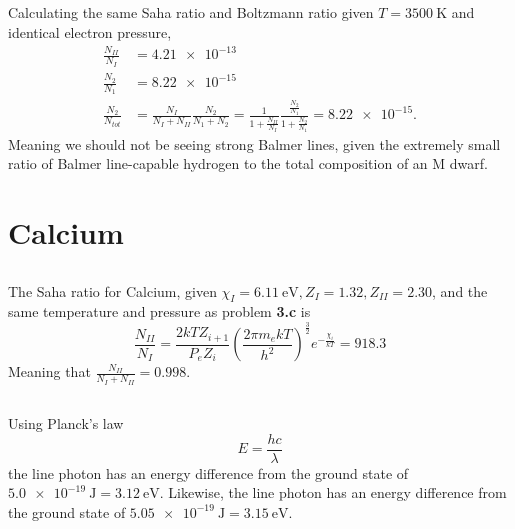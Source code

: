 \documentclass{article}
\begin{document}
\subsection{}

Calculating the same Saha ratio and Boltzmann ratio given \(T = \SI{3500}{\kelvin}\) and identical electron pressure,
\begin{align}
    \frac{N_{II}}{N_I} &= \num{4.21e-13} \\
    \frac{N_2}{N_1} &= \num{8.22e-15} \\
    \frac{N_2}{N_{tot}} &= \frac{N_I}{N_I + N_{II}} \frac{N_2}{N_1 + N_2} = \frac{1}{1 + \frac{N_{II}}{N_I}} \frac{\frac{N_2}{N_1}}{1 + \frac{N_2}{N_1}} = \num{8.22e-15}.
\end{align}
Meaning we should not be seeing strong Balmer lines, given the extremely small ratio of Balmer line-capable hydrogen to the total composition of an M dwarf.

\section{Calcium}

\subsection{}

The Saha ratio for Calcium, given \(\chi_I = \SI{6.11}{\electronvolt}, Z_I = \num{1.32}, Z_{II} = \num{2.30}\), and the same temperature and pressure as problem \textbf{3.c} is
\begin{equation}
    \frac{N_{II}}{N_I} = \frac{2 kT Z_{i + 1}}{P_e Z_i} \left(\frac{2 \pi m_e kT}{h^2}\right)^{\frac{3}{2}} e^{-\frac{\chi_i}{kT}} = \num{918.3}
\end{equation}
Meaning that \(\frac{N_{II}}{N_I + N_{II}} = \num{0.998}\).

\subsection{}

Using Planck's law
\begin{equation}
    E = \frac{h c}{\lambda}
\end{equation}
the  line photon has an energy difference from the ground state of \(\SI{5.0e-19}{\joule} = \SI{3.12}{\electronvolt}\).
Likewise, the  line photon has an energy difference from the ground state of \(\SI{5.05e-19}{\joule} = \SI{3.15}{\electronvolt}\).
\end{document}
